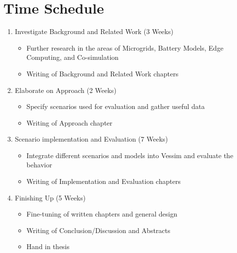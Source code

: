 \documentclass[11pt, a4paper]{report}
\begin{document}
\section*{Time Schedule}
\begin{enumerate}
    \item Investigate Background and Related Work (3 Weeks)
    \begin{itemize}
        \item Further research in the areas of Microgrids, Battery Models, Edge Computing, and Co-simulation
        \item Writing of Background and Related Work chapters
    \end{itemize}
    \item Elaborate on Approach (2 Weeks)
    \begin{itemize}
        \item Specify scenarios used for evaluation and gather useful data
        \item Writing of Approach chapter
    \end{itemize}
    \item Scenario implementation and Evaluation (7 Weeks)
    \begin{itemize}
        \item Integrate different scenarios and models into Vessim and evaluate the behavior
        \item Writing of Implementation and Evaluation chapters
    \end{itemize}
    \item Finishing Up (5 Weeks)
    \begin{itemize}
        \item Fine-tuning of written chapters and general design
        \item Writing of Conclusion/Discussion and Abstracts
        \item Hand in thesis
    \end{itemize}
\end{enumerate}



\end{document}
